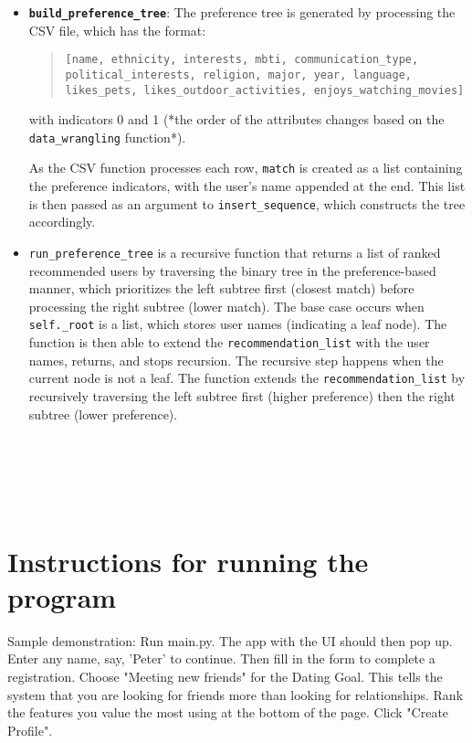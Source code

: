 \documentclass[fontsize=11pt]{article}
\begin{document}
\begin{itemize}
\item \textbf{\texttt{build\_preference\_tree}}:  
The preference tree is generated by processing the CSV file, which has the format:  

\begin{quote}
\texttt{[name, ethnicity, interests, mbti, communication\_type,} \\
\texttt{political\_interests, religion, major, year, language,} \\
\texttt{likes\_pets, likes\_outdoor\_activities, enjoys\_watching\_movies]}
\end{quote}

with indicators 0 and 1 (*the order of the attributes changes based on the \texttt{data\_wrangling} function*).  

As the CSV function processes each row, \texttt{match} is created as a list containing the preference indicators, with the user's name appended at the end. This list is then passed as an argument to \texttt{insert\_sequence}, which constructs the tree accordingly. 
\\

\item \texttt{run\_preference\_tree} is a recursive function that returns a list of ranked recommended users by traversing the binary tree in the preference-based manner, which prioritizes the left subtree first (closest match) before processing the right subtree (lower match). The base case occurs when \texttt{self.\_root} is a list, which stores user names (indicating a leaf node). The function is then able to extend the \texttt{recommendation\_list} with the user names, returns, and stops recursion. The recursive step happens when the current node is not a leaf. The function extends the \texttt{recommendation\_list} by recursively traversing the left subtree first (higher preference) then the right subtree (lower preference).
\end{itemize}
\\

\\
\\

\\
\section*{Instructions for running the program}
Sample demonstration: Run main.py. The app with the UI should then pop up. Enter any name, say, 'Peter' to continue. Then fill in the form to complete a registration. Choose "Meeting new friends" for the Dating Goal. This tells the system that you are looking for friends more than looking for relationships. Rank the features you value the most using at the bottom of the page. Click "Create Profile".
\end{document}
